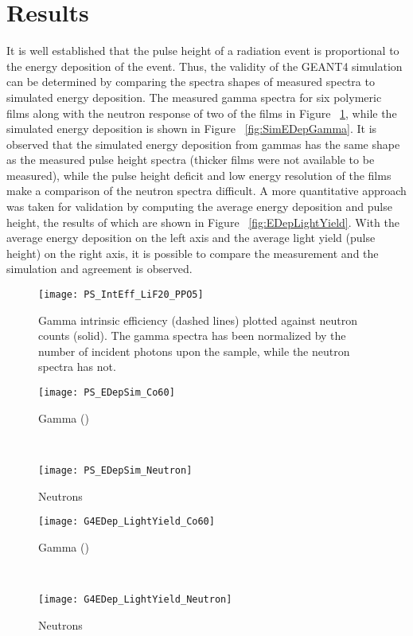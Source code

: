 \documentclass[draftcls,onecolumn]{IEEEtran}
\begin{document}
\section{Results}
\label{sec:Results}
It is well established that the pulse height of a radiation event is proportional to the energy deposition of the event\cite{birks_scintillations_1951}.
Thus, the validity of the GEANT4 simulation can be determined by comparing the spectra shapes of measured spectra to simulated energy deposition.
The measured gamma spectra for six polymeric films along with the neutron response of two of the films in Figure ~\ref{fig:GammaIntrNeutronCounts}, while the simulated energy deposition is shown in Figure ~\ref{fig:SimEDepGamma}.
It is observed that the simulated energy deposition from gammas has the same shape as the measured pulse height spectra (thicker films were not available to be measured), while the pulse height deficit and low energy resolution of the films make a comparison of the neutron spectra difficult.
A more quantitative approach was taken for validation by computing the average energy deposition and pulse height, the results of which are shown in Figure ~\ref{fig:EDepLightYield}. 
With the average energy deposition on the left axis and the average light yield (pulse height) on the right axis, it is possible to compare the measurement and the simulation and agreement is observed.
\begin{figure}[h]
    \centering
    \texttt{[image: PS\_IntEff\_LiF20\_PPO5]}
    \caption{Gamma intrinsic efficiency (dashed lines) plotted against neutron counts (solid). The gamma spectra has been normalized by the number of incident photons upon the sample, while the neutron spectra has not.}
    \label{fig:GammaIntrNeutronCounts}
\end{figure}
\begin{figure*}[h]
	\centering
	\begin{subfigure}[b]{\figurewidth}
    		\texttt{[image: PS\_EDepSim\_Co60]}
		\caption{Gamma ()}
	\end{subfigure}%
	~
	\begin{subfigure}[b]{\figurewidth}
    		\texttt{[image: PS\_EDepSim\_Neutron]}
		\caption{Neutrons}
	\end{subfigure}%
	\caption{Simulated Energy Deposition}
	\label{fig:SimEDepGamma}
\end{figure*}
\begin{figure*}[!ht]
	\centering
	\begin{subfigure}[b]{\figurewidth}
    		\texttt{[image: G4EDep\_LightYield\_Co60]}
		\caption{Gamma ()}
	\end{subfigure}%
	~
	\begin{subfigure}[b]{\figurewidth}
    		\texttt{[image: G4EDep\_LightYield\_Neutron]}
		\caption{Neutrons}
	\end{subfigure}%
	\caption{Average Energy Deposition and Measured Light Yield}
	\label{fig:EDepLightYield}
\end{figure*}
\end{document}
